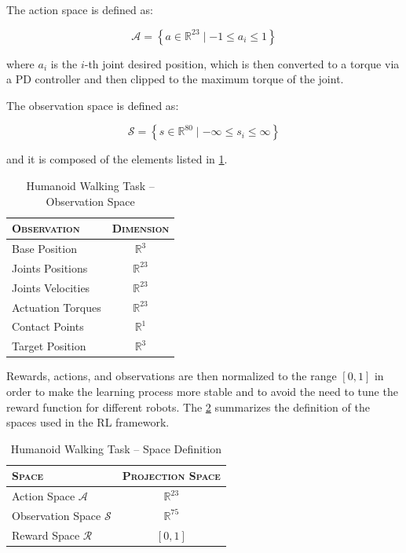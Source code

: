 The action space is defined as:

\begin{equation}
    \mathcal{A} = \left\{ a \in \mathbb{R} ^{23} \mid -1 \leq a_i \leq 1 \right\}
\end{equation}

where $a_i$ is the $i$-th joint desired position, which is then converted to a torque via a PD controller and then clipped to the maximum torque of the joint.

The observation space is defined as:

\begin{equation}
    \mathcal{S} = \left\{ s \in \mathbb{R} ^{80} \mid -\infty \leq s_i \leq \infty \right\}
\end{equation}

and it is composed of the elements listed in \cref{tab:walkingobs}.

\begin{table}
    \centering
    \label{tab:walkingobs}
    \begin{tabular}{l c}
        \toprule
        \textsc{Observation} & \textsc{Dimension} \\
        \midrule
        Base Position        & $\mathbb{R} ^{3}$  \\
        Joints Positions     & $\mathbb{R} ^{23}$ \\
        Joints Velocities    & $\mathbb{R} ^{23}$ \\
        Actuation Torques    & $\mathbb{R} ^{23}$ \\
        Contact Points       & $\mathbb{R} ^{1}$  \\
        Target Position      & $\mathbb{R} ^{3}$  \\
        \bottomrule
    \end{tabular}
    \caption{Humanoid Walking Task -- Observation Space}
\end{table}

Rewards, actions, and observations are then normalized to the range $[0,1]$ in order to make the learning process more stable and to avoid the need to tune the reward function for different robots. The \cref{tab:walkingtaskspacedef} summarizes the definition of the spaces used in the \ac{RL} framework.

\begin{table}
    \centering
    \begin{tabular}{l c}
        \toprule
        \textsc{Space}                  & \textsc{Projection Space} \\
        \midrule
        Action Space $\mathcal{A}$      & $\mathbb{R} ^{23}$        \\
        Observation Space $\mathcal{S}$ & $\mathbb{R} ^{75}$        \\
        Reward Space $\mathcal{R}$      & $[0,1]$                   \\
        \bottomrule
    \end{tabular}
    \caption{Humanoid Walking Task -- Space Definition}
    \label{tab:walkingtaskspacedef}
\end{table}


